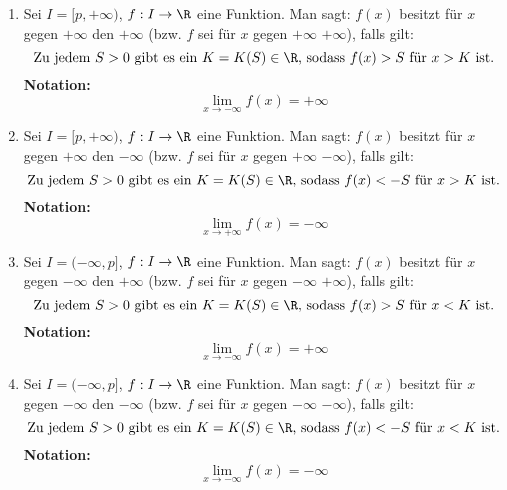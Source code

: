 \begin{enumerate}[leftmargin=*]
    \item Sei $I = [p, +\infty)$, $f: I \to \R$ eine Funktion. Man sagt: $f(x)$ besitzt für $x$ gegen $+\infty$ den  $+\infty$ (bzw. $f$ sei für $x$ gegen $+\infty$  $+\infty$), falls gilt: $$\text{Zu jedem $S > 0$ gibt es ein $K = K(S) \in \R$, sodass $f(x) > S$ für $x > K$ ist.}$$ \textbf{Notation:} $$\lim_{x \to -\infty} f(x) = +\infty$$
    \item Sei $I = [p, +\infty)$, $f: I \to \R$ eine Funktion. Man sagt: $f(x)$ besitzt für $x$ gegen $+\infty$ den  $-\infty$ (bzw. $f$ sei für $x$ gegen $+\infty$  $-\infty$), falls gilt: $$\text{Zu jedem $S > 0$ gibt es ein $K = K(S) \in \R$, sodass $f(x) < -S$ für $x > K$ ist.}$$ \textbf{Notation:} $$\lim_{x \to +\infty} f(x) = -\infty$$
    \item Sei $I = (-\infty, p]$, $f: I \to \R$ eine Funktion. Man sagt: $f(x)$ besitzt für $x$ gegen $-\infty$ den  $+\infty$ (bzw. $f$ sei für $x$ gegen $-\infty$  $+\infty$), falls gilt: $$\text{Zu jedem $S > 0$ gibt es ein $K = K(S) \in \R$, sodass $f(x) > S$ für $x < K$ ist.}$$ \textbf{Notation:} $$\lim_{x \to -\infty} f(x) = +\infty$$
    \item Sei $I = (-\infty, p]$, $f: I \to \R$ eine Funktion. Man sagt: $f(x)$ besitzt für $x$ gegen $-\infty$ den  $-\infty$ (bzw. $f$ sei für $x$ gegen $-\infty$  $-\infty$), falls gilt: $$\text{Zu jedem $S > 0$ gibt es ein $K = K(S) \in \R$, sodass $f(x) < -S$ für $x < K$ ist.}$$ \textbf{Notation:} $$\lim_{x \to -\infty} f(x) = -\infty$$
\end{enumerate}